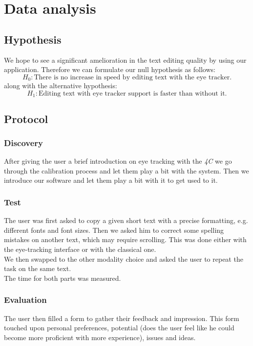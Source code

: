 \documentclass[12pt, a4paper]{article}
\begin{document}
\section{Data analysis}

\subsection{Hypothesis}
We hope to see a significant amelioration in the text editing quality by using our application. Therefore we can formulate our null hypothesis as follows: 
\[H_0: \text{There is no increase in speed by editing text with the eye tracker.}\] 
along with the alternative hypothesis: 
\[H_1: \text{Editing text with eye tracker support is faster than without it.}\]

\subsection{Protocol}

\subsubsection{Discovery}
After giving the user a brief introduction on eye tracking with the \textit{4C} we go through the calibration process and let them play a bit with the system. Then we introduce our software and let them play a bit with it to get used to it.

\subsubsection{Test}
The user was first asked to copy a given short text with a precise formatting, e.g. different fonts and font sizes. Then we asked him to correct some spelling mistakes on another text, which may require scrolling. This was done either with the eye-tracking interface or with the classical one. \\
We then swapped to the other modality choice and asked the user to repeat the task on the same text. \\
The time for both parts was measured. 

\subsubsection{Evaluation}
The user then filled a form to gather their feedback and impression. This form touched upon personal preferences, potential (does the user feel like he could become more proficient with more experience), issues and ideas. 
\end{document}

